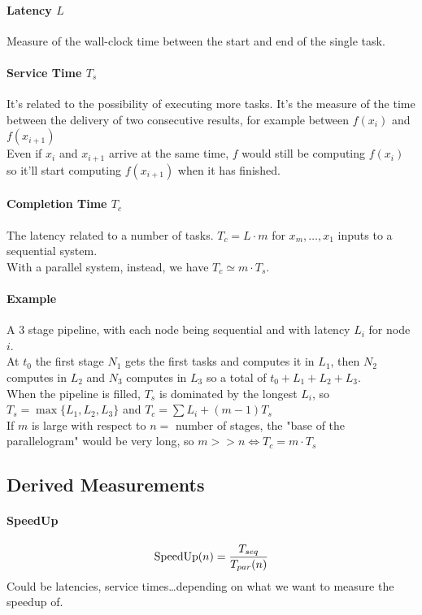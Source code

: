 \documentclass[10pt]{report}
\begin{document}
\paragraph{Latency $L$} Measure of the wall-clock time between the start and end of the single task.
\paragraph{Service Time $T_s$} It's related to the possibility of executing more tasks. It's the measure of the time between the delivery of two consecutive results, for example between $f(x_i)$ and $f(x_{i+1})$\\
Even if $x_i$ and $x_{i+1}$ arrive at the same time, $f$ would still be computing $f(x_i)$ so it'll start computing $f(x_{i+1})$ when it has finished.
\paragraph{Completion Time $T_c$} The latency related to a number of tasks. $T_c = L\cdot m$ for $x_m,\ldots,x_1$ inputs to a sequential system.\\
With a parallel system, instead, we have $T_c\simeq m\cdot T_s$.
\paragraph{Example} A 3 stage pipeline, with each node being sequential and with latency $L_i$ for node $i$.\\
At $t_0$ the first stage $N_1$ gets the first tasks and computes it in $L_1$, then $N_2$ computes in $L_2$ and $N_3$ computes in $L_3$ so a total of $t_0 + L_1 + L_2 + L_3$.\\
When the pipeline is filled, $T_s$ is dominated by the longest $L_i$, so $T_s = \max\{L_1, L_2, L_3\}$ and $T_c = \sum L_i + (m-1)T_s$\\
If $m$ is large with respect to $n=$ number of stages, the "base of the parallelogram" would be very long, so $m >> n \Leftrightarrow T_c = m\cdot T_s$
\subsection{Derived Measurements}
\paragraph{SpeedUp} $$\hbox{SpeedUp}(n) = \frac{T_{seq}}{T_{par}(n)}$$ Could be latencies, service times\ldots depending on what we want to measure the speedup of.
\end{document}
